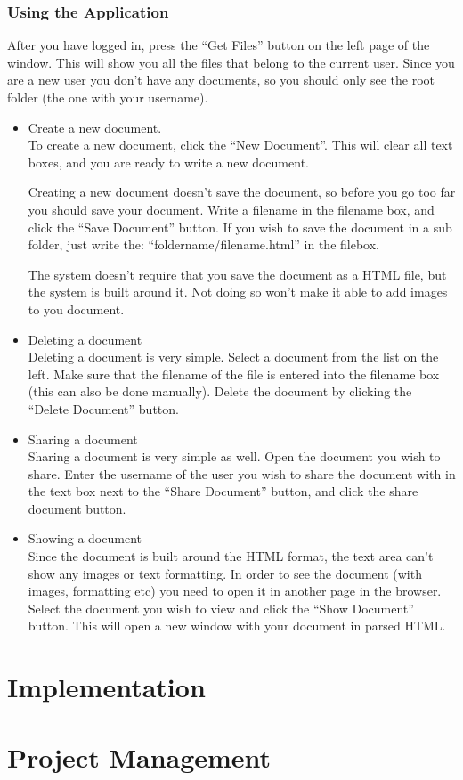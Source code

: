 \documentclass[11pt]{article}
\begin{document}
\subsubsection{Using the Application}
\label{sec-3-5-2}

    After you have logged in, press the ``Get Files'' button on the left page of the window. 
    This will show you all the files that belong to the current user. Since you are a new user you don't 
    have any documents, so you should only see the root folder (the one with your username).
\begin{itemize}

\item Create a new document.\\
\label{sec-3-5-2-1}%
To create a new document, click the ``New Document''. This will clear all text boxes, and you are ready
     to write a new document.

     Creating a new document doesn't save the document, so before you go too far you should save your document.
     Write a filename in the filename box, and click the ``Save Document'' button.
     If you wish to save the document in a sub folder, just write the: ``foldername/filename.html'' in the filebox.

     The system doesn't require that you save the document as a HTML file, but the system is built around it. Not 
     doing so won't make it able to add images to you document.

\item Deleting a document\\
\label{sec-3-5-2-2}%
Deleting a document is very simple.
     Select a document from the list on the left. Make sure that the filename of the file is entered into the 
     filename box (this can also be done manually). Delete the document by clicking the ``Delete Document'' button.

\item Sharing a document\\
\label{sec-3-5-2-3}%
Sharing a document is very simple as well.
     Open the document you wish to share. Enter the username of the user you wish to share the document with in
     the text box next to the ``Share Document'' button, and click the share document button.

\item Showing a document\\
\label{sec-3-5-2-4}%
Since the document is built around the HTML format, the text area can't show any images or text formatting.
     In order to see the document (with images, formatting etc) you need to open it in another page in the 
     browser.
     Select the document you wish to view and click the ``Show Document'' button. This will open a new window 
     with your document in parsed HTML.

\end{itemize} %
\section{Implementation}
\label{sec-4}
\section{Project Management}
\label{sec-5}
\end{document}
